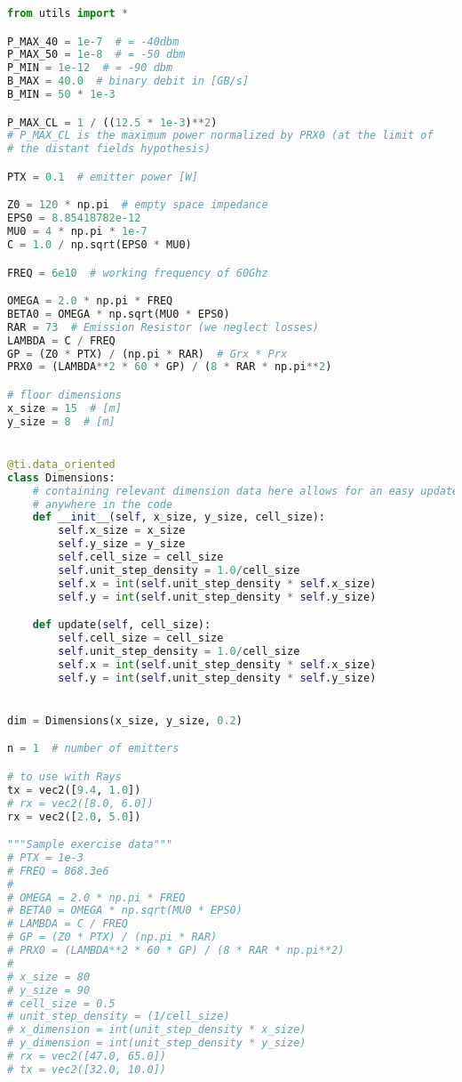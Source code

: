 \begin{lstlisting}[language=python]
from utils import *

P_MAX_40 = 1e-7  # = -40dbm
P_MAX_50 = 1e-8  # = -50 dbm
P_MIN = 1e-12  # = -90 dbm
B_MAX = 40.0  # binary debit in [GB/s]
B_MIN = 50 * 1e-3

P_MAX_CL = 1 / ((12.5 * 1e-3)**2)
# P_MAX_CL is the maximum power normalized by PRX0 (at the limit of
# the distant fields hypothesis)

PTX = 0.1  # emitter power [W]

Z0 = 120 * np.pi  # empty space impedance
EPS0 = 8.85418782e-12
MU0 = 4 * np.pi * 1e-7
C = 1.0 / np.sqrt(EPS0 * MU0)

FREQ = 6e10  # working frequency of 60Ghz

OMEGA = 2.0 * np.pi * FREQ
BETA0 = OMEGA * np.sqrt(MU0 * EPS0)
RAR = 73  # Emission Resistor (we neglect losses)
LAMBDA = C / FREQ
GP = (Z0 * PTX) / (np.pi * RAR)  # Grx * Prx
PRX0 = (LAMBDA**2 * 60 * GP) / (8 * RAR * np.pi**2)

# floor dimensions
x_size = 15  # [m]
y_size = 8  # [m]


@ti.data_oriented
class Dimensions:
    # containing relevant dimension data here allows for an easy update from
    # anywhere in the code
    def __init__(self, x_size, y_size, cell_size):
        self.x_size = x_size
        self.y_size = y_size
        self.cell_size = cell_size
        self.unit_step_density = 1.0/cell_size
        self.x = int(self.unit_step_density * self.x_size)
        self.y = int(self.unit_step_density * self.y_size)

    def update(self, cell_size):
        self.cell_size = cell_size
        self.unit_step_density = 1.0/cell_size
        self.x = int(self.unit_step_density * self.x_size)
        self.y = int(self.unit_step_density * self.y_size)


dim = Dimensions(x_size, y_size, 0.2)

n = 1  # number of emitters

# to use with Rays
tx = vec2([9.4, 1.0])
# rx = vec2([8.0, 6.0])
rx = vec2([2.0, 5.0])

"""Sample exercise data"""
# PTX = 1e-3
# FREQ = 868.3e6
#
# OMEGA = 2.0 * np.pi * FREQ
# BETA0 = OMEGA * np.sqrt(MU0 * EPS0)
# LAMBDA = C / FREQ
# GP = (Z0 * PTX) / (np.pi * RAR)
# PRX0 = (LAMBDA**2 * 60 * GP) / (8 * RAR * np.pi**2)
#
# x_size = 80
# y_size = 90
# cell_size = 0.5
# unit_step_density = (1/cell_size)
# x_dimension = int(unit_step_density * x_size)
# y_dimension = int(unit_step_density * y_size)
# rx = vec2([47.0, 65.0])
# tx = vec2([32.0, 10.0])

\end{lstlisting}